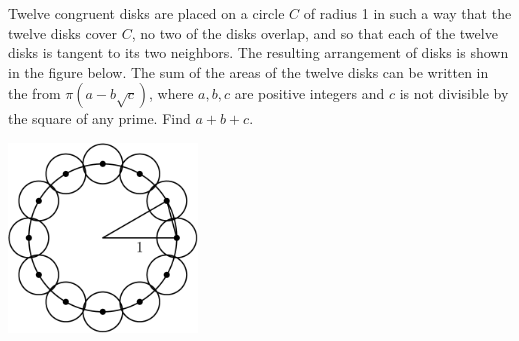 Twelve congruent disks are placed on a circle $C$ of radius 1 in such a way that the twelve disks cover $C$, no two of the disks overlap, and so that each of the twelve disks is tangent to its two neighbors. The resulting arrangement of disks is shown in the figure below.  The sum of the areas of the twelve disks can be written in the from $\pi(a-b\sqrt{c})$, where $a,b,c$ are positive integers and $c$ is not divisible by the square of any prime. Find $a+b+c$.

\begin{center}
\includegraphics[width = 50.400000000000006mm]{img/fig0.png}
\end{center}